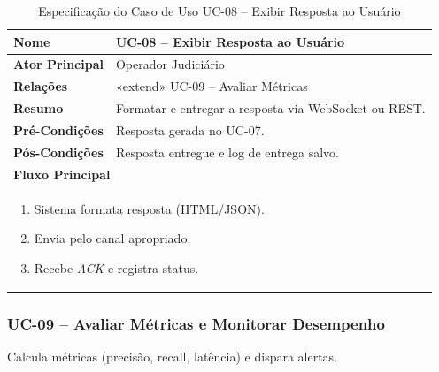 \begin{table}[H]
\centering
\caption{Especificação do Caso de Uso UC-08 – Exibir Resposta ao Usuário}
\label{tab:uc08}
\begin{tabular}{|p{4cm}|p{11cm}|}
\hline
\textbf{Nome}        & UC-08 – Exibir Resposta ao Usuário \\ \hline
\textbf{Ator Principal} & Operador Judiciário \\ \hline
\textbf{Relações}    & {\small «extend» UC-09 – Avaliar Métricas} \\ \hline
\textbf{Resumo}      & Formatar e entregar a resposta via WebSocket ou REST. \\ \hline
\textbf{Pré-Condições} & Resposta gerada no UC-07. \\ \hline
\textbf{Pós-Condições} & Resposta entregue e log de entrega salvo. \\ \hline
\multicolumn{2}{|l|}{\textbf{Fluxo Principal}} \\ \hline
\multicolumn{2}{|p{15cm}|}{%
\begin{enumerate}[leftmargin=*]
  \item Sistema formata resposta (HTML/JSON).
  \item Envia pelo canal apropriado.
  \item Recebe \textit{ACK} e registra status.
\end{enumerate}} \\ \hline
\end{tabular}
\end{table}

\subsubsection{UC-09 – Avaliar Métricas e Monitorar Desempenho}

\noindent
Calcula métricas (precisão, recall, latência) e dispara alertas.

